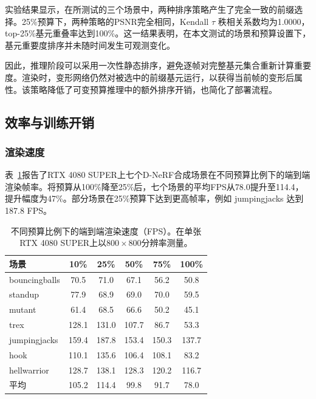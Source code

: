\documentclass[sn-mathphys]{sn-jnl}
\begin{document}
实验结果显示，在所测试的三个场景中，两种排序策略产生了完全一致的前缀选择。25\%预算下，两种策略的PSNR完全相同，Kendall $\tau$ 秩相关系数均为1.0000，top-25\%基元重叠率达到100\%。这一结果表明，在本文测试的场景和预算设置下，基元重要度排序并未随时间发生可观测变化。

因此，推理阶段可以采用一次性静态排序，避免逐帧对完整基元集合重新计算重要度。渲染时，变形网络仍然对被选中的前缀基元运行，以获得当前帧的变形后属性。该策略降低了可变预算推理中的额外排序开销，也简化了部署流程。

\subsection{效率与训练开销}
\label{sec:efficiency}

\subsubsection{渲染速度}

表~\ref{tab:fps}报告了RTX 4080 SUPER上七个D-NeRF合成场景在不同预算比例下的端到端渲染帧率。将预算从100\%降至25\%后，七个场景的平均FPS从78.0提升至114.4，提升幅度为47\%。部分场景在25\%预算下达到更高帧率，例如 jumpingjacks 达到187.8 FPS。

\begin{table}[!htbp]
\caption{不同预算比例下的端到端渲染速度（FPS）。在单张RTX 4080 SUPER上以$800\times800$分辨率测量。}
\label{tab:fps}
\centering
\small
\setlength{\tabcolsep}{5pt}
\begin{tabular}{lccccc}
\toprule
场景 & 10\% & 25\% & 50\% & 75\% & 100\% \\
\midrule
bouncingballs & 70.5 & 71.0 & 67.1 & 56.2 & 50.8 \\
standup       & 77.9 & 68.9 & 69.0 & 70.0 & 59.5 \\
mutant        & 61.4 & 68.5 & 66.6 & 50.2 & 45.1 \\
trex          & 128.1 & 131.0 & 107.7 & 86.7 & 53.3 \\
jumpingjacks  & 159.4 & 187.8 & 153.4 & 150.3 & 137.7 \\
hook          & 110.1 & 135.6 & 106.4 & 108.1 & 83.2 \\
hellwarrior   & 128.7 & 138.1 & 128.3 & 120.2 & 116.7 \\
\midrule
平均          & 105.2 & 114.4 & 99.8 & 91.7 & 78.0 \\
\bottomrule
\end{tabular}
\end{table}
\end{document}
